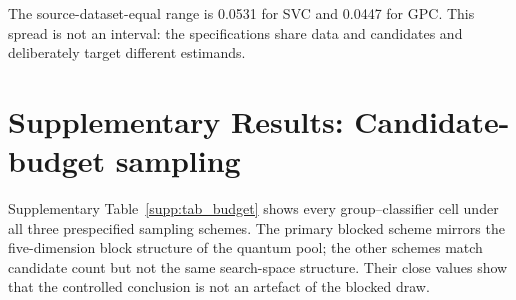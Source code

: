 \documentclass[11pt]{article}
\begin{document}
The source-dataset-equal range is 0.0531 for SVC and 0.0447 for GPC.
This spread is not an interval: the specifications share data and candidates
and deliberately target different estimands.

\section*{Supplementary Results: Candidate-budget sampling}
\label{supp:budget}

Supplementary Table~\ref{supp:tab_budget} shows every group--classifier cell under all three
prespecified sampling schemes. The primary blocked scheme mirrors the
five-dimension block structure of the quantum pool; the other schemes match
candidate count but not the same search-space structure. Their close values
show that the controlled conclusion is not an artefact of the blocked draw.
\end{document}
